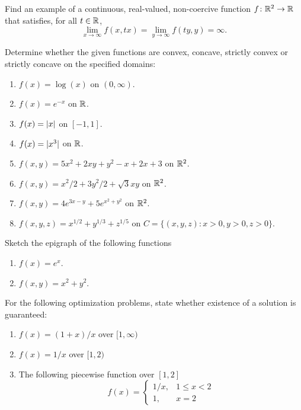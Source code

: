 \begin{problem}[Advanced]\cite[p.36, \#32]{peressini1988mathematics}
Find an example of a continuous, real-valued, non-coercive function $f\colon \mathbb{R}^2 \to \mathbb{R}$ that satisfies, for all $t \in \mathbb{R}$,
\begin{equation*}
\lim_{x \to \infty} f(x, tx) = \lim_{y \to \infty} f(ty, y) = \infty.
\end{equation*}
\end{problem}


\begin{problem}[Basic]\cite[p.77, \#1,2,7]{peressini1988mathematics}
Determine whether the given functions are convex, concave, strictly convex or strictly concave on the specified domains:
\begin{enumerate}
	\item $f(x) = \log(x)$ on $(0,\infty)$.
	\item $f(x) = e^{-x}$ on $\mathbb{R}$.
	\item $f(x) = \lvert x \rvert$ on $[-1,1]$.
	\item $f(x) = \lvert x^3 \rvert$ on $\mathbb{R}$.
	\item $f(x,y) = 5x^2+2xy+y^2-x+2x+3$ on $\mathbb{R}^2$.
	\item $f(x,y) = x^2/2+3y^2/2+\sqrt{3}xy$ on $\mathbb{R}^2$.
	\item $f(x,y) = 4e^{3x-y}+5e^{x^2+y^2}$ on $\mathbb{R}^2$.
	\item $f(x,y,z) = x^{1/2} + y^{1/3} + z^{1/5}$ on $C = \{ (x,y,z) : x>0, y>0, z>0 \}$.
\end{enumerate}
\end{problem}

\begin{problem}[Intermediate]\cite[p.79 \#11]{peressini1988mathematics}
Sketch the epigraph of the following functions
\begin{enumerate}
	\item $f(x) = e^x$.
	\item $f(x,y)=x^2+y^2$.
\end{enumerate}
\end{problem}


\begin{problem}[Intermediate]
For the following optimization problems, state whether existence of a solution is guaranteed:
\begin{enumerate}
	\item $f(x) = (1+x)/x$ over $[1,\infty)$
	\item $f(x) = 1/x$ over $[1,2)$
	\item The following piecewise function over $[1,2]$
	\begin{equation*}
	f(x) = \begin{cases}
	1/x, &1\leq x<2 \\
	1,   &x=2
	\end{cases}
	\end{equation*}
\end{enumerate}
\end{problem}

